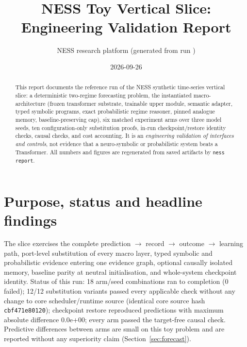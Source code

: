 \documentclass[10pt,a4paper]{article}
\title{\vspace{-1.2cm}NESS Toy Vertical Slice: Engineering Validation Report}
\author{NESS research platform (generated from run \code{20260926-220302-final})}
\date{2026-09-26}
\newcommand{\code}[1]{\texttt{\small #1}}
\begin{document}
\maketitle
\vspace{-0.8cm}
\begin{abstract}
\noindent This report documents the reference run of the NESS synthetic time-series vertical slice: a deterministic two-regime forecasting problem, the instantiated macro-architecture (frozen transformer substrate, trainable upper module, semantic adapter, typed symbolic programs, exact probabilistic regime reasoner, pinned analogue memory, baseline-preserving cap), six matched experiment arms over three model seeds, ten configuration-only substitution proofs, in-run checkpoint/restore identity checks, causal checks, and cost accounting. It is an \emph{engineering validation of interfaces and controls}, not evidence that a neuro-symbolic or probabilistic system beats a Transformer. All numbers and figures are regenerated from saved artifacts by \code{ness report}.
\end{abstract}

\section{Purpose, status and headline findings}
The slice exercises the complete prediction $\rightarrow$ record $\rightarrow$ outcome $\rightarrow$ learning path, port-level substitution of every macro layer, typed symbolic and probabilistic evidence entering one evidence graph, optional causally isolated memory, baseline parity at neutral initialisation, and whole-system checkpoint identity. Status of this run: 18 arm/seed combinations ran to completion (0 failed); 12/12 substitution variants passed every applicable check without any change to core scheduler/runtime source (identical core source hash \code{cbf471e80120}); checkpoint restore reproduced predictions with maximum absolute difference 0.0e+00; every arm passed the target-free causal check. Predictive differences between arms are small on this toy problem and are reported without any superiority claim (Section~\ref{sec:forecast}).
\end{document}
